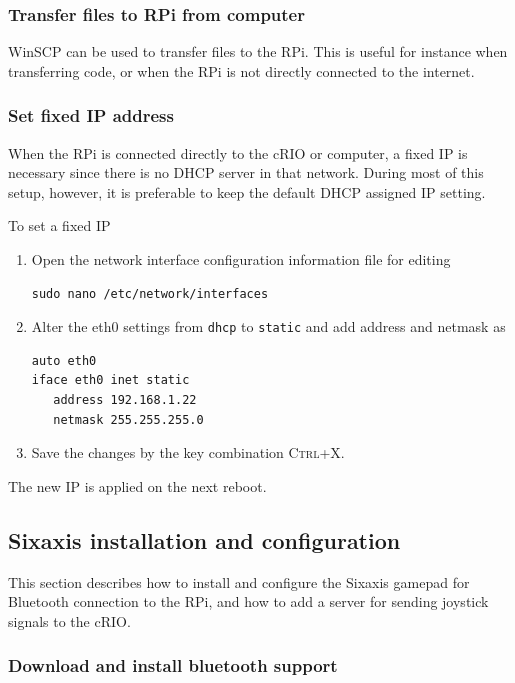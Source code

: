 \documentclass[a4paper,twoside,english]{report}
\newcommand{\noun}[1]{\textsc{#1}}
\begin{document}
\subsubsection{\label{subsec: Transfer files to RPi}Transfer files to RPi from
computer}

WinSCP can be used to transfer files to the RPi. This is useful for
instance when transferring code, or when the RPi is not directly connected
to the internet.

\subsubsection{Set fixed IP address}

When the RPi is connected directly to the cRIO or computer, a fixed
IP is necessary since there is no DHCP server in that network. During
most of this setup, however, it is preferable to keep the default
DHCP assigned IP setting.

To set a fixed IP
\begin{enumerate}
\item Open the network interface configuration information file for editing\begin{verbatim}sudo nano /etc/network/interfaces\end{verbatim}
\item Alter the eth0 settings from \texttt{dhcp} to \texttt{static} and
add address and netmask as\begin{verbatim}auto eth0
iface eth0 inet static
   address 192.168.1.22
   netmask 255.255.255.0\end{verbatim}
\item Save the changes by the key combination \noun{Ctrl+X}.
\end{enumerate}
The new IP is applied on the next reboot.

\FloatBarrier

\newpage{}

\subsection{Sixaxis installation and configuration}

This section describes how to install and configure the Sixaxis gamepad
for Bluetooth connection to the RPi, and how to add a server for sending
joystick signals to the cRIO.

\subsubsection{Download and install bluetooth support}
\end{document}
